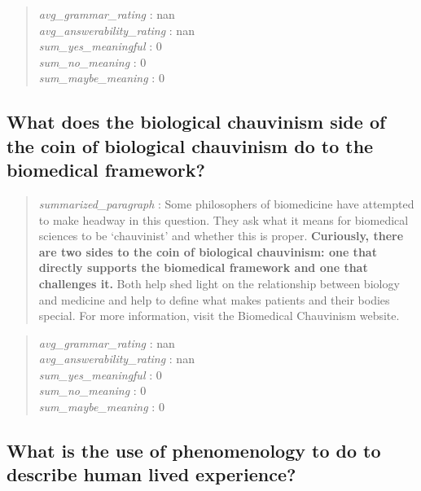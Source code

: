 \begin{quote}
\emph{avg\_grammar\_rating} : nan\\
\emph{avg\_answerability\_rating} : nan\\
\emph{sum\_yes\_meaningful} : 0\\
\emph{sum\_no\_meaning} : 0\\
\emph{sum\_maybe\_meaning} : 0
\end{quote}

\hypertarget{what-does-the-biological-chauvinism-side-of-the-coin-of-biological-chauvinism-do-to-the-biomedical-framework-1}{%
\subsection{What does the biological chauvinism side of the coin of
biological chauvinism do to the biomedical
framework?}\label{what-does-the-biological-chauvinism-side-of-the-coin-of-biological-chauvinism-do-to-the-biomedical-framework-1}}

\begin{quote}
\emph{summarized\_paragraph} : Some philosophers of biomedicine have
attempted to make headway in this question. They ask what it means for
biomedical sciences to be `chauvinist' and whether this is proper.
\textbf{Curiously, there are two sides to the coin of biological
chauvinism: one that directly supports the biomedical framework and one
that challenges it.} Both help shed light on the relationship between
biology and medicine and help to define what makes patients and their
bodies special. For more information, visit the Biomedical Chauvinism
website.
\end{quote}

\begin{quote}
\emph{avg\_grammar\_rating} : nan\\
\emph{avg\_answerability\_rating} : nan\\
\emph{sum\_yes\_meaningful} : 0\\
\emph{sum\_no\_meaning} : 0\\
\emph{sum\_maybe\_meaning} : 0
\end{quote}

\hypertarget{what-is-the-use-of-phenomenology-to-do-to-describe-human-lived-experience}{%
\subsection{What is the use of phenomenology to do to describe human
lived
experience?}\label{what-is-the-use-of-phenomenology-to-do-to-describe-human-lived-experience}}


